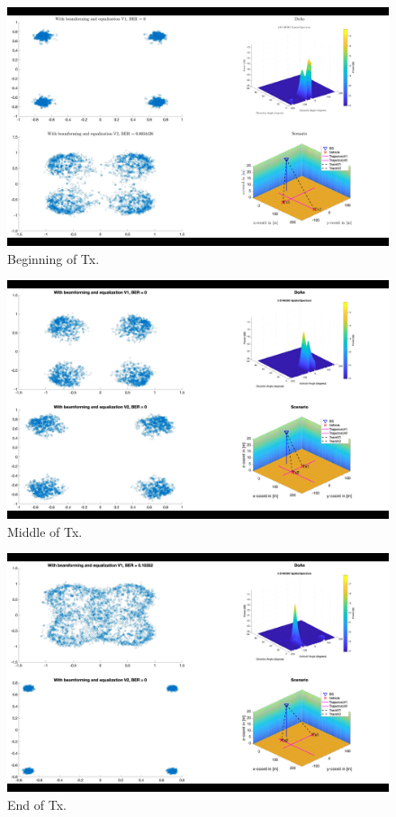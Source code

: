 \begin{figure}[ht]
    \includegraphics[width=\linewidth]{Begin_tx.png}
      \caption{Beginning of Tx.}
      \label{fig:Begin_tx}
\end{figure}
\begin{figure}[ht]
    \includegraphics[width=\linewidth]{Middle_tx.png}
      \caption{Middle of Tx.}
      \label{fig:Middle_tx}
\end{figure}
\begin{figure}[ht]
    \includegraphics[width=\linewidth]{End_tx.png}
      \caption{End of Tx.}
      \label{fig:End_tx}
\end{figure}
